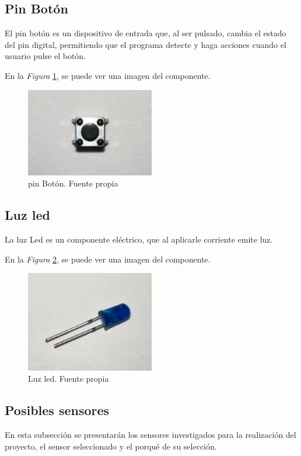 \subsection{Pin Botón}
El pin botón es un dispositivo de entrada que, al ser pulsado, cambia el estado del pin digital, permitiendo que el programa detecte y haga acciones cuando el usuario pulse el botón.

En la \textit{Figura} \ref{fig:pinBoton}, se puede ver una imagen del componente.

\begin{figure}[h]
        \centering
        \includegraphics[width=0.5\textwidth]{img/pinBoton.png}
        \caption{pin Botón. Fuente propia}
        \label{fig:pinBoton}
    \end{figure}
\subsection{Luz led}
La luz Led es un componente eléctrico, que al aplicarle corriente emite luz.

En la \textit{Figura} \ref{fig:LuzLed}, se puede ver una imagen del componente.

\begin{figure}[h]
        \centering
        \includegraphics[width=0.5\textwidth]{img/Luzled.png}
        \caption{Luz led. Fuente propia}
        \label{fig:LuzLed}
    \end{figure}
    
\subsection{Posibles sensores}
En esta subsección se presentarán los sensores investigados para la realización del proyecto, el sensor seleccionado y el porqué de su selección.
